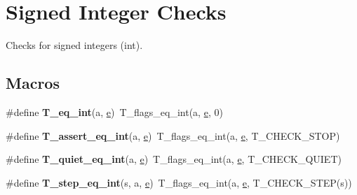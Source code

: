 \hypertarget{group__RTEMSTestFrameworkChecksInt}{}\section{Signed Integer Checks}
\label{group__RTEMSTestFrameworkChecksInt}


Checks for signed integers (int).  


\subsection*{Macros}
\begin{DoxyCompactItemize}
\item 
\mbox{\label{group__RTEMSTestFrameworkChecksInt_gacceb854988e48486bbf2fb396e6b54b6}} 
\#define {\bfseries T\+\_\+eq\+\_\+int}(a,  \mbox{\hyperlink{sun4u_2tte_8h_a8b0b9ed08e0e18920ec2682f48228c27}{e}})~T\+\_\+flags\+\_\+eq\+\_\+int(a, \mbox{\hyperlink{sun4u_2tte_8h_a8b0b9ed08e0e18920ec2682f48228c27}{e}}, 0)
\item 
\mbox{\label{group__RTEMSTestFrameworkChecksInt_ga835ac2ad445160ffc0f0dfb239c4a81b}} 
\#define {\bfseries T\+\_\+assert\+\_\+eq\+\_\+int}(a,  \mbox{\hyperlink{sun4u_2tte_8h_a8b0b9ed08e0e18920ec2682f48228c27}{e}})~T\+\_\+flags\+\_\+eq\+\_\+int(a, \mbox{\hyperlink{sun4u_2tte_8h_a8b0b9ed08e0e18920ec2682f48228c27}{e}}, T\+\_\+\+C\+H\+E\+C\+K\+\_\+\+S\+T\+OP)
\item 
\mbox{\label{group__RTEMSTestFrameworkChecksInt_ga87c71b20576c2feedd3869e0b63c8bf0}} 
\#define {\bfseries T\+\_\+quiet\+\_\+eq\+\_\+int}(a,  \mbox{\hyperlink{sun4u_2tte_8h_a8b0b9ed08e0e18920ec2682f48228c27}{e}})~T\+\_\+flags\+\_\+eq\+\_\+int(a, \mbox{\hyperlink{sun4u_2tte_8h_a8b0b9ed08e0e18920ec2682f48228c27}{e}}, T\+\_\+\+C\+H\+E\+C\+K\+\_\+\+Q\+U\+I\+ET)
\item 
\mbox{\label{group__RTEMSTestFrameworkChecksInt_gafd8ad255c911170723480f3e0b542cc5}} 
\#define {\bfseries T\+\_\+step\+\_\+eq\+\_\+int}(s,  a,  \mbox{\hyperlink{sun4u_2tte_8h_a8b0b9ed08e0e18920ec2682f48228c27}{e}})~T\+\_\+flags\+\_\+eq\+\_\+int(a, \mbox{\hyperlink{sun4u_2tte_8h_a8b0b9ed08e0e18920ec2682f48228c27}{e}}, T\+\_\+\+C\+H\+E\+C\+K\+\_\+\+S\+T\+EP(s))

\end{DoxyCompactItemize}
